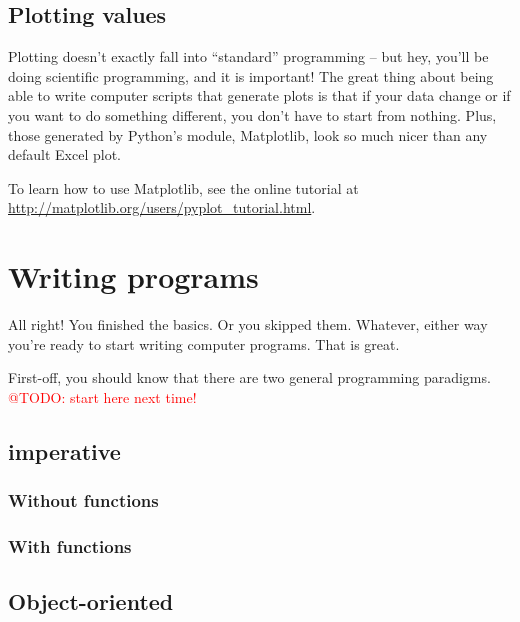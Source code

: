 \documentclass[a4paper,10pt]{scrartcl}
\makeatletter
\newcommand{\todo}[1]{\textcolor{red}{@TODO: #1}}
\makeatother
\begin{document}
\subsection{Plotting values}

Plotting doesn't exactly fall into ``standard'' programming -- but hey, you'll be doing scientific programming, and it is important! The great thing about being able to write computer scripts that generate plots is that if your data change or if you want to do something different, you don't have to start from nothing. Plus, those generated by Python's module, Matplotlib, look so much nicer than any default Excel plot.

To learn how to use Matplotlib, see the online tutorial at \url{http://matplotlib.org/users/pyplot_tutorial.html}.

\section{Writing programs}

All right! You finished the basics. Or you skipped them. Whatever, either way you're ready to start writing computer programs. That is great.

First-off, you should know that there are two general programming paradigms. \todo{start here next time!}

\subsection{imperative}

\subsubsection{Without functions}

\subsubsection{With functions}

\subsection{Object-oriented}
\end{document}
